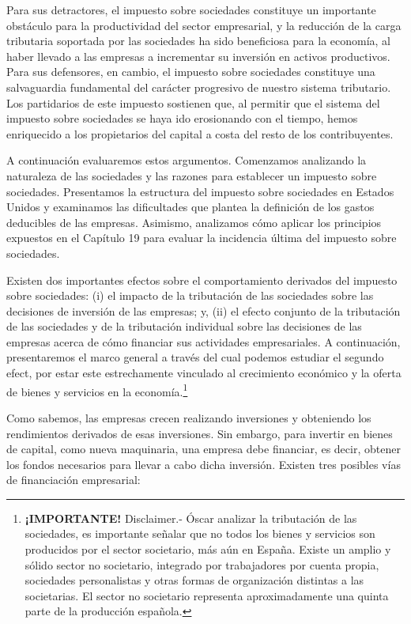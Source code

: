 \documentclass[10pt,a4paper]{article}
\begin{document}
{Para sus detractores, el impuesto sobre sociedades constituye un importante obstáculo para la productividad del sector empresarial, y la reducción de la carga tributaria soportada por las sociedades ha sido beneficiosa para la economía, al haber llevado a las empresas a incrementar su inversión en activos productivos. Para sus defensores, en cambio, el impuesto sobre sociedades constituye una salvaguardia fundamental del carácter progresivo de nuestro sistema tributario. Los partidarios de este impuesto sostienen que, al permitir que el sistema del impuesto sobre sociedades se haya ido erosionando con el tiempo, hemos enriquecido a los propietarios del capital a costa del resto de los contribuyentes.

A continuación evaluaremos estos argumentos. Comenzamos analizando la naturaleza de las sociedades y las razones para establecer un impuesto sobre sociedades. Presentamos la estructura del impuesto sobre sociedades en Estados Unidos y examinamos las dificultades que plantea la definición de los gastos deducibles de las empresas. Asimismo, analizamos cómo aplicar los principios expuestos en el Capítulo 19 para evaluar la incidencia última del impuesto sobre sociedades. 
}

Existen dos importantes efectos sobre el comportamiento derivados del impuesto sobre sociedades: (i) el impacto de la tributación de las sociedades sobre las decisiones de inversión de las empresas; y, (ii) el efecto conjunto de la tributación de las sociedades y de la tributación individual sobre las decisiones de las empresas acerca de cómo financiar sus actividades empresariales. A continuación, presentaremos el marco general a través del cual podemos estudiar el segundo efect, por estar este estrechamente vinculado al crecimiento económico y la oferta de bienes y servicios en la economía.\footnote{
\textbf{¡IMPORTANTE!} Disclaimer.- Óscar analizar la tributación de las sociedades, es importante señalar que no todos los bienes y servicios son producidos por el sector societario, más aún en España. Existe un amplio y sólido sector no societario, integrado por trabajadores por cuenta propia, sociedades personalistas y otras formas de organización distintas a las societarias. El sector no societario representa aproximadamente una quinta parte de la producción española.
}

Como sabemos, las empresas crecen realizando inversiones y obteniendo los rendimientos derivados de esas inversiones. Sin embargo, para invertir en bienes de capital, como nueva maquinaria, una empresa debe financiar, es decir, obtener los fondos necesarios para llevar a cabo dicha inversión. Existen tres posibles vías de financiación empresarial:
\end{document}
